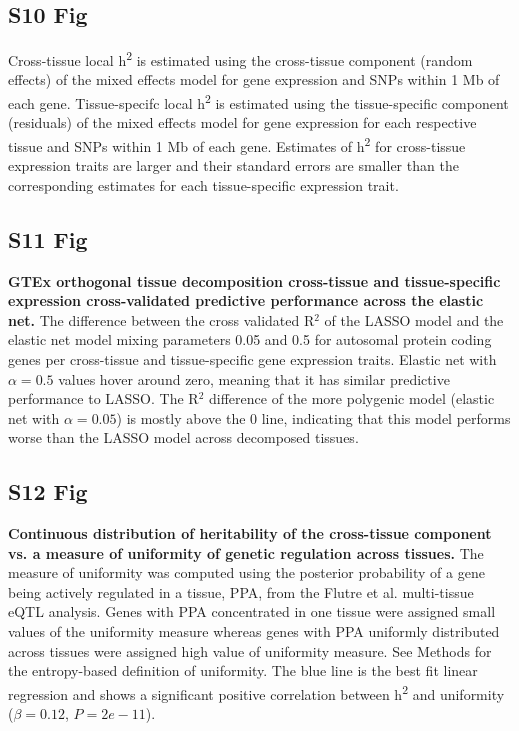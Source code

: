 \documentclass[10pt,letterpaper]{article}
\begin{document}
\begin{singlespace}
\subsection*{S10 Fig}
\label{S10_Fig}

 Cross-tissue local h\textsuperscript{2} is estimated using the cross-tissue component (random effects) of the mixed effects model for gene expression and SNPs within 1 Mb of each gene. Tissue-specifc local h\textsuperscript{2} is estimated using the tissue-specific component (residuals) of the mixed effects model for gene expression for each respective tissue and SNPs within 1 Mb of each gene. Estimates of h\textsuperscript{2} for cross-tissue expression traits are larger and their standard errors are smaller than the corresponding estimates for each tissue-specific expression trait.

\subsection*{S11 Fig}
\label{S11_Fig}
{\bf GTEx orthogonal tissue decomposition cross-tissue and tissue-specific expression cross-validated predictive performance across the elastic net.} The difference between the cross validated R$^2$ of the LASSO model and the elastic net model mixing parameters 0.05 and 0.5 for autosomal protein coding genes per cross-tissue and tissue-specific gene expression traits. Elastic net with $\alpha=0.5$ values hover around zero, meaning that it has similar predictive performance to LASSO. The R$^2$ difference of the more polygenic model (elastic net with $\alpha=0.05$) is mostly above the 0 line, indicating that this model performs worse than the LASSO model across decomposed tissues.
\end{singlespace}
\pagebreak

\subsection*{S12 Fig}
\label{S12_Fig}
{\bf Continuous distribution of heritability of the cross-tissue component vs. a measure of uniformity of genetic regulation across tissues.}
The measure of uniformity was computed using the posterior probability of a gene being actively regulated in a tissue, PPA, from the Flutre et al. \cite{Flutre_2013} multi-tissue eQTL analysis. Genes with PPA concentrated in one tissue were assigned small values of the uniformity measure whereas genes with PPA uniformly distributed across tissues were assigned high value of uniformity measure. See Methods for the entropy-based definition of uniformity. The blue line is the best fit linear regression and shows a significant positive correlation between h\textsuperscript{2} and uniformity ($\beta = 0.12$, $P = 2e-11$).
\end{document}
